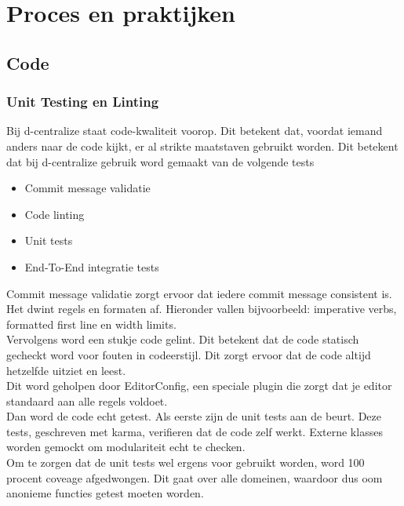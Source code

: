 \chapter{Proces en praktijken}

\section{Code}

\subsection{Unit Testing en Linting}

Bij d-centralize staat code-kwaliteit voorop. Dit betekent dat, voordat iemand anders naar de code kijkt, er al strikte maatstaven gebruikt worden. Dit betekent dat bij d-centralize gebruik word gemaakt van de volgende tests

\begin{itemize}
	\item Commit message validatie
	\item Code linting
	\item Unit tests
	\item End-To-End integratie tests
\end{itemize}

Commit message validatie zorgt ervoor dat iedere commit message consistent is. Het dwint regels en formaten af. Hieronder vallen bijvoorbeeld: imperative verbs, formatted first line en width limits. \\

Vervolgens word een stukje code gelint. Dit betekent dat de code statisch gecheckt word voor fouten in codeerstijl. Dit zorgt ervoor dat de code altijd hetzelfde uitziet en leest. \\

Dit word geholpen door EditorConfig, een speciale plugin die zorgt dat je editor standaard aan alle regels voldoet. \\

Dan word de code echt getest. Als eerste zijn de unit tests aan de beurt. Deze tests, geschreven met karma, verifieren dat de code zelf werkt. Externe klasses worden gemockt om modulariteit echt te checken. \\

Om te zorgen dat de unit tests wel ergens voor gebruikt worden, word 100 procent coveage afgedwongen. Dit gaat over alle domeinen, waardoor dus oom anonieme functies getest moeten worden. \\

